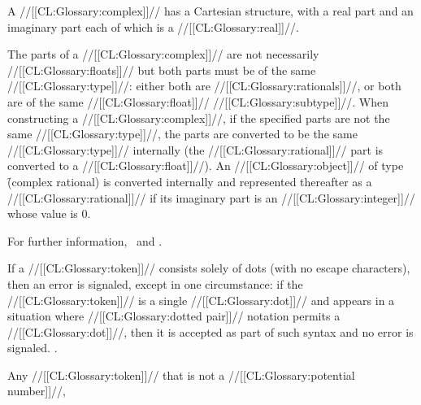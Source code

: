 \endsubsubsection%





A //[[CL:Glossary:complex]]// has a Cartesian structure, 
with a real part and an imaginary part each of which is a 
//[[CL:Glossary:real]]//.

The parts of a //[[CL:Glossary:complex]]// are not necessarily //[[CL:Glossary:floats]]// 
but both parts must be of the same //[[CL:Glossary:type]]//: 
either both are //[[CL:Glossary:rationals]]//, or both are of the same //[[CL:Glossary:float]]// //[[CL:Glossary:subtype]]//.
When constructing a //[[CL:Glossary:complex]]//, if the specified parts are not the
same //[[CL:Glossary:type]]//, the parts are converted to be the same //[[CL:Glossary:type]]//
internally (\ie the //[[CL:Glossary:rational]]// part is converted to a //[[CL:Glossary:float]]//). 
An //[[CL:Glossary:object]]// of type \f{(complex rational)} is converted internally
and represented thereafter as a //[[CL:Glossary:rational]]// if its imaginary part is an 
//[[CL:Glossary:integer]]// whose value is 0.

For further information, \seesection\SharpsignC\ and \secref\PrintingComplexes.

\endsubsubsection%

\endsubsection%



If a //[[CL:Glossary:token]]// consists solely of dots (with no escape characters),
then an error  is signaled,
except in one circumstance:
if the //[[CL:Glossary:token]]// is a single //[[CL:Glossary:dot]]//
and appears in a situation where //[[CL:Glossary:dotted pair]]// notation permits a //[[CL:Glossary:dot]]//,
then it is accepted as part of such syntax and no error is signaled. 
\Seesection\LeftParen.

\endsubsection%


Any //[[CL:Glossary:token]]// that is not a //[[CL:Glossary:potential number]]//,

